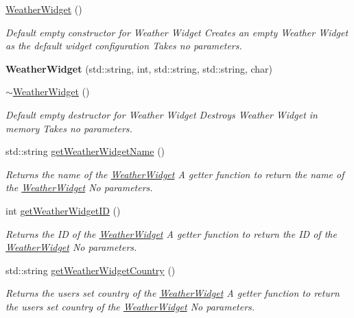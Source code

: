 \begin{DoxyCompactItemize}
\item 
\mbox{\hyperlink{class_weather_widget_a671797f620c32b858c7746e4f8dd3a82}{Weather\+Widget}} ()
\begin{DoxyCompactList}\small\item\em Default empty constructor for Weather Widget  Creates an empty Weather Widget as the default widget configuration  Takes no parameters. \end{DoxyCompactList}\item 
\mbox{\label{class_weather_widget_abce378d53f41ebe5739a85433d4fb86b}} 
{\bfseries Weather\+Widget} (std\+::string, int, std\+::string, std\+::string, char)
\item 
\mbox{\hyperlink{class_weather_widget_a1550f9b797beb612bc9346de32866735}{$\sim$\+Weather\+Widget}} ()
\begin{DoxyCompactList}\small\item\em Default empty destructor for Weather Widget  Destroys Weather Widget in memory  Takes no parameters. \end{DoxyCompactList}\item 
std\+::string \mbox{\hyperlink{class_weather_widget_a5127020f0dd4df0d2d64c7c2a6da2ae5}{get\+Weather\+Widget\+Name}} ()
\begin{DoxyCompactList}\small\item\em Returns the name of the \mbox{\hyperlink{class_weather_widget}{Weather\+Widget}}  A getter function to return the name of the \mbox{\hyperlink{class_weather_widget}{Weather\+Widget}}  No parameters. \end{DoxyCompactList}\item 
int \mbox{\hyperlink{class_weather_widget_abaa5920ec25ec5981d2c1f347550acf4}{get\+Weather\+Widget\+ID}} ()
\begin{DoxyCompactList}\small\item\em Returns the ID of the \mbox{\hyperlink{class_weather_widget}{Weather\+Widget}}  A getter function to return the ID of the \mbox{\hyperlink{class_weather_widget}{Weather\+Widget}}  No parameters. \end{DoxyCompactList}\item 
std\+::string \mbox{\hyperlink{class_weather_widget_a1c31534566187d4dfc82014ac123ebcb}{get\+Weather\+Widget\+Country}} ()
\begin{DoxyCompactList}\small\item\em Returns the user\textquotesingle{}s set country of the \mbox{\hyperlink{class_weather_widget}{Weather\+Widget}}  A getter function to return the user\textquotesingle{}s set country of the \mbox{\hyperlink{class_weather_widget}{Weather\+Widget}}  No parameters. \end{DoxyCompactList}\item 

\end{DoxyCompactItemize}
